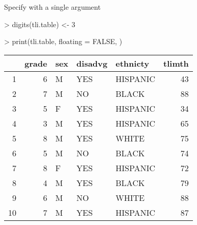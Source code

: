 \documentclass[letterpaper]{article}
\begin{document}
Specify with a single argument 
\begin{Schunk}
\begin{Sinput}
> digits(tli.table) <- 3
\end{Sinput}
\end{Schunk}
\begin{Schunk}
\begin{Sinput}
> print(tli.table, floating = FALSE, )
\end{Sinput}
% latex table generated in R 2.6.0 by xtable 1.5-2 package
% Wed Oct 10 14:26:37 2007
\begin{tabular}{|rr|lp{3cm}l|r|}
  \hline
 & grade & sex & disadvg & ethnicty & tlimth \\
  \hline
1 &    6 & M & YES & HISPANIC &   43 \\
  2 &    7 & M & NO & BLACK &   88 \\
  3 &    5 & F & YES & HISPANIC &   34 \\
  4 &    3 & M & YES & HISPANIC &   65 \\
  5 &    8 & M & YES & WHITE &   75 \\
  6 &    5 & M & NO & BLACK &   74 \\
  7 &    8 & F & YES & HISPANIC &   72 \\
  8 &    4 & M & YES & BLACK &   79 \\
  9 &    6 & M & NO & WHITE &   88 \\
  10 &    7 & M & YES & HISPANIC &   87 \\
   \hline
\end{tabular}\end{Schunk}
\end{document}
